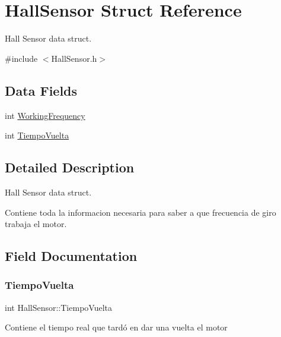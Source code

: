 \hypertarget{struct_hall_sensor}{}\section{Hall\+Sensor Struct Reference}
\label{struct_hall_sensor}


Hall Sensor data struct.  




{\ttfamily \#include $<$Hall\+Sensor.\+h$>$}

\subsection*{Data Fields}
\begin{DoxyCompactItemize}
\item 
int \mbox{\hyperlink{struct_hall_sensor_aa9598178f2fba9eae32ca1f27fedb76d}{Working\+Frequency}}
\item 
int \mbox{\hyperlink{struct_hall_sensor_aea93d53e0446642c786dd83f8f5f0cde}{Tiempo\+Vuelta}}
\end{DoxyCompactItemize}


\subsection{Detailed Description}
Hall Sensor data struct. 

Contiene toda la informacion necesaria para saber a que frecuencia de giro trabaja el motor. 

\subsection{Field Documentation}
\mbox{\label{struct_hall_sensor_aea93d53e0446642c786dd83f8f5f0cde}} 
\subsubsection{\texorpdfstring{Tiempo\+Vuelta}{TiempoVuelta}}
{\footnotesize\ttfamily int Hall\+Sensor\+::\+Tiempo\+Vuelta}

Contiene el tiempo real que tardó en dar una vuelta el motor \mbox{\label{struct_hall_sensor_aa9598178f2fba9eae32ca1f27fedb76d}} 
